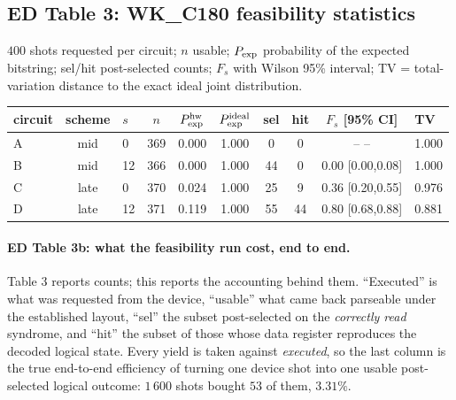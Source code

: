 \documentclass[10pt,a4paper]{article}
\begin{document}
\subsection*{ED Table 3: WK\_C180 feasibility statistics}
$400$ shots requested per circuit; $n$ usable; $P_{\rm exp}$ probability of
the expected bitstring; sel/hit post-selected counts; $F_s$ with Wilson
95\% interval; TV = total-variation distance to the exact ideal joint
distribution.
\begin{longtable}{lclcccccc}
\toprule circuit & scheme & $s$ & $n$ & $P_{\rm exp}^{\rm hw}$ & $P_{\rm exp}^{\rm ideal}$ & sel & hit & $F_s$ [95\% CI] & TV \\ \midrule
A & mid & 0 & 369 & 0.000 & 1.000 & 0 & 0 & -- -- & 1.000 \\
B & mid & 12 & 366 & 0.000 & 1.000 & 44 & 0 & 0.00 [0.00,0.08] & 1.000 \\
C & late & 0 & 370 & 0.024 & 1.000 & 25 & 9 & 0.36 [0.20,0.55] & 0.976 \\
D & late & 12 & 371 & 0.119 & 1.000 & 55 & 44 & 0.80 [0.68,0.88] & 0.881 \\
\bottomrule\end{longtable}

\paragraph*{ED Table 3b: what the feasibility run cost, end to end.}
Table 3 reports counts; this reports the accounting behind them.  ``Executed'' is
what was requested from the device, ``usable'' what came back parseable under the
established layout, ``sel'' the subset post-selected on the \emph{correctly read}
syndrome, and ``hit'' the subset of those whose data register reproduces the decoded
logical state.  Every yield is taken against \emph{executed}, so the last column is
the true end-to-end efficiency of turning one device shot into one usable
post-selected logical outcome: $1\,600$ shots bought $53$ of them, $3.31\%$.
\end{document}

